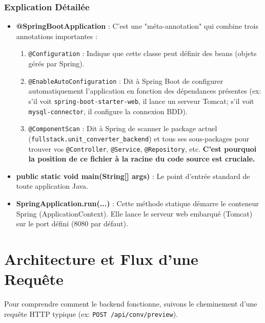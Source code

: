 \documentclass{article}
\begin{document}
\subsubsection{Explication Détailée}

\begin{itemize}
    \item \textbf{@SpringBootApplication} : C'est une "méta-annotation" qui combine trois annotations importantes :
    \begin{enumerate}
        \item \texttt{@Configuration} : Indique que cette classe peut définir des beans (objets gérés par Spring).
        \item \texttt{@EnableAutoConfiguration} : Dit à Spring Boot de configurer automatiquement l'application en fonction des dépendances présentes (ex: s'il voit \texttt{spring-boot-starter-web}, il lance un serveur Tomcat; s'il voit \texttt{mysql-connector}, il configure la connexion BDD).
        \item \texttt{@ComponentScan} : Dit à Spring de scanner le package actuel (\texttt{fullstack.unit\_converter\_backend}) et tous ses sous-packages pour trouver vos \texttt{@Controller}, \texttt{@Service}, \texttt{@Repository}, etc. \textbf{C'est pourquoi la position de ce fichier à la racine du code source est cruciale.}
    \end{enumerate}

    \item \textbf{public static void main(String[] args)} : Le point d'entrée standard de toute application Java.

    \item \textbf{SpringApplication.run(...)} : Cette méthode statique démarre le conteneur Spring (ApplicationContext). Elle lance le serveur web embarqué (Tomcat) sur le port défini (8080 par défaut).
\end{itemize}

\section{Architecture et Flux d'une Requête}

Pour comprendre comment le backend fonctionne, suivons le cheminement d'une requête HTTP typique (ex: \texttt{POST /api/conv/preview}).
\end{document}
